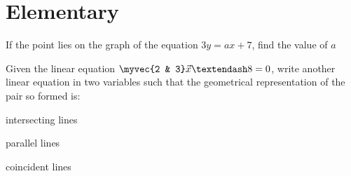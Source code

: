 \section{Elementary}
\item If the point  lies on the graph of the equation $3y = ax + 7$, find the value of $a$
\\
\solution

\item Given the linear equation $\myvec{2 & 3}\vec{x} – 8 = 0$, write another linear equation in two variables such that the geometrical representation of the pair so formed is: 
%
\begin{enumerate}[itemsep=2pt]
\begin{multicols}{2}
\item  intersecting lines
\item parallel lines 
\item  coincident lines
\end{multicols}
\end{enumerate}
%
\solution


